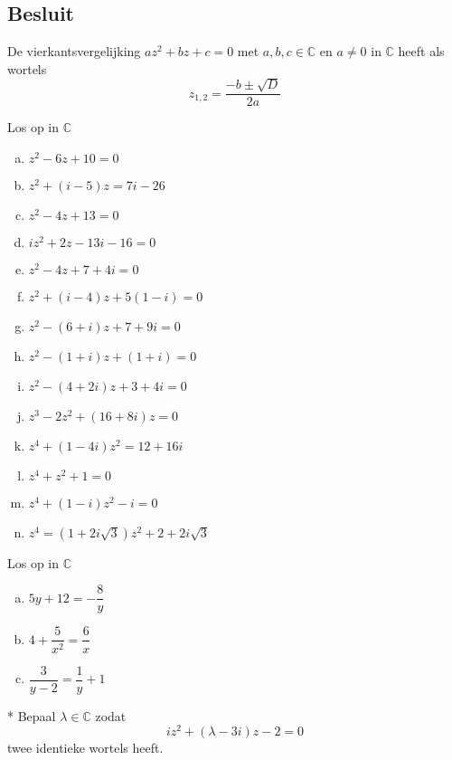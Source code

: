 \documentclass[12pt,twoside]{article}
\begin{document}
\subsection{Besluit}

\begin{mdframed}
De vierkantsvergelijking $az^2+bz+c=0$ met $a,b,c\in\mathbb{C}$ en $a\neq 0$ in $\mathbb{C}$ heeft als wortels
$$ z_{1,2}=\dfrac{-b\pm\sqrt{D}}{2a}$$
\end{mdframed}

\begin{oefening}
  Los op in $\mathbb{C}$
  \begin{enumerate}[(a)]
    \itemsep 1em
  \item $z^2-6z+10=0$
  \item $z^2+(i-5)z=7i-26$
  \item $z^2-4z+13=0$
  \item $iz^2+2z-13i-16=0$
  \item $z^2-4z+7+4i=0$
  \item $z^2+(i-4)z+5(1-i)=0$
  \item $z^2-(6+i)z+7+9i=0$
  \item $z^2-(1+i)z+(1+i)=0$
  \item $z^2-(4+2i)z+3+4i=0$
  \item $z^3-2z^2+(16+8i)z=0$
  \item $z^4+(1-4i)z^2=12+16i$
  \item $z^4+z^2+1=0$
  \item $z^4+(1-i)z^2-i=0$
  \item $z^4=(1+2i\sqrt{3})z^2+2+2i\sqrt{3}$
  \end{enumerate}
\end{oefening}

\begin{oefening}
Los op in $\mathbb{C}$
  \begin{enumerate}[(a)]
    \itemsep 1em
  \item $5y+12=-\dfrac{8}{y}$
  \item $4+\dfrac{5}{x^2}=\dfrac{6}{x}$
  \item $\dfrac{3}{y-2}=\dfrac{1}{y}+1$
  \end{enumerate}
\end{oefening}

\pagebreak
\begin{oefening}*
  Bepaal $\lambda\in\mathbb{C}$ zodat
  $$iz^2+(\lambda-3i)z-2=0$$
  twee identieke wortels heeft.
\end{oefening}
\end{document}
